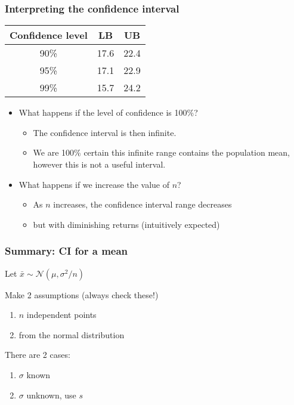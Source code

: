 \begin{frame}\frametitle{Interpreting the confidence interval}

	\begin{center}
		\begin{tabular}{c|cc}
			\textbf{Confidence level} & \textbf{LB} & \textbf{UB}\\ \hline
			90\%	& 17.6	&	22.4\\
			95\%	& 17.1	&	22.9\\
			99\%	& 15.7	&	24.2\\
		\end{tabular}
	\end{center}
	\begin{itemize}
		\item What happens if the level of confidence is 100\%? \pause
		\begin{itemize}
			\item The confidence interval is then infinite.
			\item We are 100\% certain this infinite range contains the population mean, however this is not a useful interval.
		\end{itemize}
		\item What happens if we increase the value of $n$? \pause
		\begin{itemize}
			\item As $n$ increases, the confidence interval range decreases
			\item but with diminishing returns (intuitively expected)
		\end{itemize}
	\end{itemize}
\end{frame}

\begin{frame}\frametitle{Summary: CI for a mean}

	Let $\bar{x} \sim \mathcal{N}(\mu, \sigma^2/n)$

	Make 2 assumptions (always check these!)
	\begin{enumerate}
		\item $n$ independent points
		\item from the normal distribution
	\end{enumerate}

	There are 2 cases:
	\begin{enumerate}
		\item $\sigma$ known
		\item $\sigma$ unknown, use $s$
	\end{enumerate}
\end{frame}

